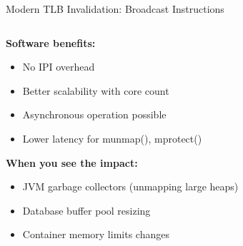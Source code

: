 \documentclass[aspectratio=169,12pt]{beamer}
\begin{document}
\begin{frame}{Modern TLB Invalidation: Broadcast Instructions}
\begin{columns}[T]
\begin{column}{0.45\textwidth}
\begin{center}
\end{center}

\textbf{Software benefits:}
\begin{itemize}
\item No IPI overhead
\item Better scalability with core count
\item Asynchronous operation possible
\item Lower latency for munmap(), mprotect()
\end{itemize}

\textbf{When you see the impact:}
\begin{itemize}
\item JVM garbage collectors (unmapping large heaps)
\item Database buffer pool resizing
\item Container memory limits changes
\end{itemize}
\end{column}
\end{columns}
\end{frame}
\end{document}
